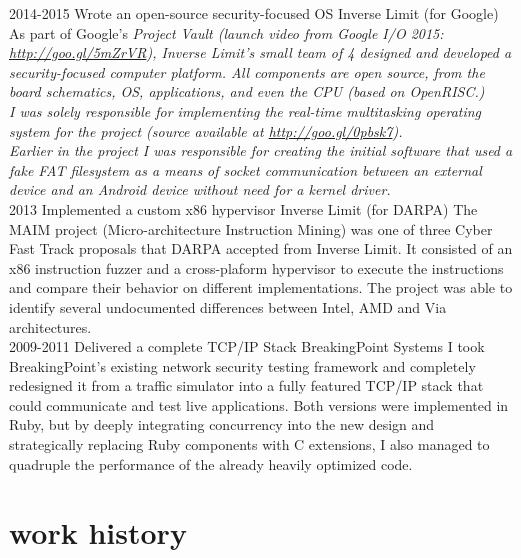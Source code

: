 \documentclass[]{friggeri-cv}
\begin{document}
\begin{entrylist}
  \entry
      {2014-2015}
      {Wrote an open-source security-focused OS}
      {Inverse Limit (for Google)}
      {
        As part of Google's \em{Project Vault} (launch video from Google I/O 2015: \href{http://goo.gl/5mZrVR}{http://goo.gl/5mZrVR}), Inverse Limit's small team of 4 designed and developed a security-focused computer platform. All components are open source, from the board schematics, OS, applications, and even the CPU (based on OpenRISC.)\\
        
        I was solely responsible for implementing the real-time multitasking operating system for the project (source available at \href{http://goo.gl/0pbsk7}{http://goo.gl/0pbsk7}).\\
        
        Earlier in the project I was responsible for creating the initial software that used a fake FAT filesystem as a means of socket communication between an external device and an Android device without need for a kernel driver.\\

      }
  \entry
      {2013}
      {Implemented a custom x86 hypervisor}
      {Inverse Limit (for DARPA)}
      {The MAIM project (Micro-architecture Instruction Mining) was one of three Cyber Fast Track proposals that DARPA accepted from Inverse Limit. It consisted of an x86 instruction fuzzer and a cross-plaform hypervisor to execute the instructions and compare their behavior on different implementations. The project was able to identify several undocumented differences between Intel, AMD and Via architectures.\\

      }
  \entry
      {2009-2011}
      {Delivered a complete TCP/IP Stack}
      {BreakingPoint Systems}
      {I took BreakingPoint's existing network security testing framework and completely redesigned it from a traffic simulator into a fully featured TCP/IP stack that could communicate and test live applications. Both versions were implemented in Ruby, but by deeply integrating concurrency into the new design and strategically replacing Ruby components with C extensions, I also managed to quadruple the performance of the already heavily optimized code.}
\end{entrylist}
\newpage

\section{work history}
\end{document}
